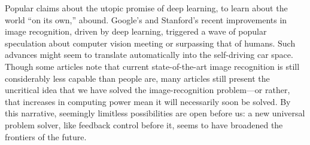Popular claims
about the utopic promise of deep learning, to
learn about the world ``on its own,''
abound. Google's and Stanford's recent
improvements in image recognition, driven by deep learning,
\cite{markoffImage} triggered a wave 
of popular speculation about computer vision meeting or surpassing
that of humans. Such
advances might seem to translate automatically into the self-driving
car space. Though some articles note that current
state-of-the-art image recognition is still considerably less capable
than people are, many articles still present the uncritical idea that we have solved
the image-recognition problem---or rather, that increases in computing
power mean it will necessarily soon be solved. By this narrative, seemingly limitless
possibilities are open before us: a new universal problem solver, like
feedback control before it, seems to have broadened the frontiers
of the future. 



